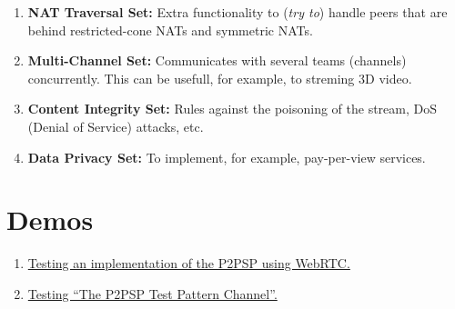 \documentclass{article}
\begin{document}
\begin{enumerate}
\ifx \HCode\Undfef
\else
{}
\fi

\item \textbf{NAT Traversal Set:} Extra functionality to (\emph{try
    to}) handle peers that are behind restricted-cone NATs and
  symmetric NATs.

\item \textbf{Multi-Channel Set:} Communicates with several teams
  (channels) concurrently. This can be usefull, for example, to
  streming 3D video.

\ifx \HCode\Undfef
\else
{}
\fi

\item \textbf{Content Integrity Set:} Rules against the poisoning
  of the stream, DoS (Denial of Service) attacks, etc.

\item \textbf{Data Privacy Set:} To implement, for
  example, pay-per-view services.

\end{enumerate}
\normalsize

\part*{Demos}
\begin{enumerate}
\item \href{https://www.youtube.com/watch?v=R7035-XaZd4}{Testing an implementation of the P2PSP using WebRTC.}

\ifx \HCode\Undfef
\else
{}
\fi


\item \href{https://www.youtube.com/watch?v=sB3u9U49woM}{Testing ``The P2PSP Test Pattern Channel''.}

\ifx \HCode\Undfef
\else
{}
\fi

\end{enumerate}
\end{document}
